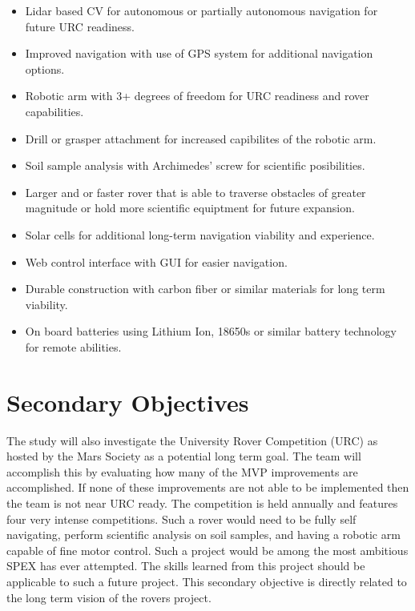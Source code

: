 \documentclass[conference]{IEEEtran} %
\begin{document}
\begin{itemize}
  \item Lidar based CV for autonomous or partially autonomous navigation for future URC readiness. 
  \item Improved navigation with use of GPS system for additional navigation options. 
  \item Robotic arm with 3+ degrees of freedom for URC readiness and rover capabilities. 
  \item Drill or grasper attachment for increased capibilites of the robotic arm.
  \item Soil sample analysis with Archimedes' screw for scientific posibilities. 
  \item Larger and or faster rover that is able to traverse obstacles of greater magnitude or hold more scientific equiptment for future expansion. %
  \item Solar cells for additional long-term navigation viability and experience. 
  \item Web control interface with GUI for easier navigation. 
  \item Durable construction with carbon fiber or similar materials for long term viability.
  \item On board batteries using Lithium Ion, 18650s or similar battery technology for remote abilities.
\end{itemize}


\section{Secondary Objectives}
\label{sec:secondary-obj}
The study will also investigate the University Rover Competition (URC) as hosted by the Mars Society as a potential long term goal. 
The team will accomplish this by evaluating how many of the MVP improvements are accomplished. 
If none of these improvements are not able to be implemented then the team is not near URC ready.
The competition is held annually and features four very intense competitions. 
Such a rover would need to be fully self navigating, perform scientific analysis on soil samples, and having a robotic arm capable of fine motor control. 
Such a project would be among the most ambitious SPEX has ever attempted. The skills learned from this project should be applicable to such a future project. 
This secondary objective is directly related to the long term vision of the rovers project. 
\end{document}
